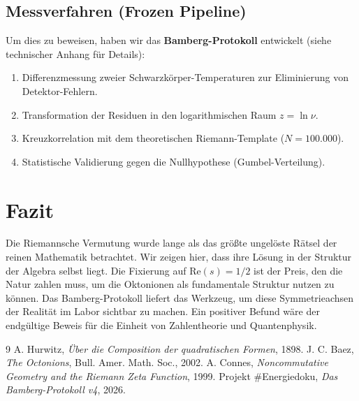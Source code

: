 \documentclass[11pt, a4paper]{article}
\begin{document}
	\subsection{Messverfahren (Frozen Pipeline)}
	Um dies zu beweisen, haben wir das \textbf{Bamberg-Protokoll} entwickelt (siehe technischer Anhang für Details):
	\begin{enumerate}
		\item Differenzmessung zweier Schwarzkörper-Temperaturen zur Eliminierung von Detektor-Fehlern.
		\item Transformation der Residuen in den logarithmischen Raum $z = \ln \nu$.
		\item Kreuzkorrelation mit dem theoretischen Riemann-Template ($N=100.000$).
		\item Statistische Validierung gegen die Nullhypothese (Gumbel-Verteilung).
	\end{enumerate}
	
	\section{Fazit}
	
	Die Riemannsche Vermutung wurde lange als das größte ungelöste Rätsel der reinen Mathematik betrachtet. Wir zeigen hier, dass ihre Lösung in der Struktur der Algebra selbst liegt. Die Fixierung auf $\text{Re}(s)=1/2$ ist der Preis, den die Natur zahlen muss, um die Oktonionen als fundamentale Struktur nutzen zu können.
	Das Bamberg-Protokoll liefert das Werkzeug, um diese \glqq Symmetrieachsen der Realität\grqq{} im Labor sichtbar zu machen. Ein positiver Befund wäre der endgültige Beweis für die Einheit von Zahlentheorie und Quantenphysik.
	
	\begin{thebibliography}{9}
		 A. Hurwitz, \textit{Über die Composition der quadratischen Formen}, 1898.
		 J. C. Baez, \textit{The Octonions}, Bull. Amer. Math. Soc., 2002.
		 A. Connes, \textit{Noncommutative Geometry and the Riemann Zeta Function}, 1999.
		 Projekt \#Energiedoku, \textit{Das Bamberg-Protokoll v4}, 2026.
	\end{thebibliography}
	
\end{document}
